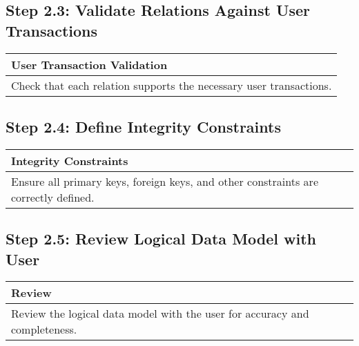 \documentclass[a4paper,12pt]{article}
\begin{document}
\subsection*{Step 2.3: Validate Relations Against User Transactions}
\begin{table}[H]
\centering
\begin{tabularx}{\textwidth}{|X|}
\hline
\rowcolor{green!20} \textbf{User Transaction Validation} \\
\hline
Check that each relation supports the necessary user transactions. \\
\hline
\end{tabularx}
\end{table}

\subsection*{Step 2.4: Define Integrity Constraints}
\begin{table}[H]
\centering
\begin{tabularx}{\textwidth}{|X|}
\hline
\rowcolor{green!20} \textbf{Integrity Constraints} \\
\hline
Ensure all primary keys, foreign keys, and other constraints are correctly defined. \\
\hline
\end{tabularx}
\end{table}

\subsection*{Step 2.5: Review Logical Data Model with User}
\begin{table}[H]
\centering
\begin{tabularx}{\textwidth}{|X|}
\hline
\rowcolor{green!20} \textbf{Review} \\
\hline
Review the logical data model with the user for accuracy and completeness. \\
\hline
\end{tabularx}
\end{table}
\end{document}
